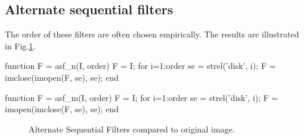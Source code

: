 \subsection{Alternate sequential filters}
The order of these filters are often chosen empirically. The results are illustrated in Fig.\ref{fig:geodesic_filtering:matlab:asf}.

\begin{matlab}
function F = asf_n(I, order)
F = I;
for i=1:order
    se = strel('disk', i);
    F = imclose(imopen(F, se), se);
end
\end{matlab}

\begin{matlab}
function F = asf_m(I, order)
F = I;
for i=1:order
    se = strel('disk', i);
    F = imopen(imclose(F, se), se);
end 
\end{matlab}

\begin{figure}[htbp]
 \centering
 \hfill
 \hfill
 \caption{Alternate Sequential Filters compared to original image.}
 \label{fig:geodesic_filtering:matlab:asf}
\end{figure}

